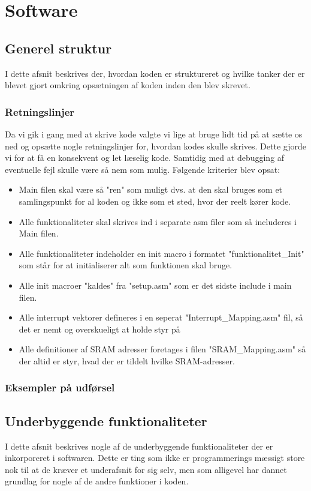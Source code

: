 \section{Software}

\subsection{Generel struktur}
I dette afsnit beskrives der, hvordan koden er struktureret og hvilke tanker der er blevet gjort omkring opsætningen af koden inden den blev skrevet.

\subsubsection{Retningslinjer}
Da vi gik i gang med at skrive kode valgte vi lige at bruge lidt tid på at sætte os ned og opsætte nogle retningslinjer for, hvordan kodes skulle skrives. Dette gjorde vi for at få en konsekvent og let læselig kode. Samtidig med at debugging af eventuelle fejl skulle være så nem som mulig. Følgende kriterier blev opsat:

\begin{itemize}
	\item Main filen skal være så "ren" som muligt dvs. at den skal bruges som et samlingspunkt for al koden og ikke som et 		sted, hvor der reelt kører kode.
	\item Alle funktionaliteter skal skrives ind i separate asm filer som så includeres i Main filen.
	\item Alle funktionaliteter indeholder en init macro i formatet "funktionalitet\_Init" som står for at initialiserer 			alt som funktionen skal bruge. 
	\item Alle init macroer "kaldes" fra "setup.asm" som er det sidste include i main filen.
	\item Alle interrupt vektorer defineres i en seperat "Interrupt\_Mapping.asm" fil, så det er nemt og overskueligt at 			holde styr på
	\item Alle definitioner af SRAM adresser foretages i filen "SRAM\_Mapping.asm" så der altid er styr, hvad der er 				tildelt hvilke SRAM-adresser.
\end{itemize}

\subsubsection{Eksempler på udførsel}

\subsection{Underbyggende funktionaliteter}
I dette afsnit beskrives nogle af de underbyggende funktionaliteter der er inkorporeret i softwaren. Dette er ting som ikke er programmerings mæssigt store nok til at de kræver et underafsnit for sig selv, men som alligevel har dannet grundlag for nogle af de andre funktioner i koden.

